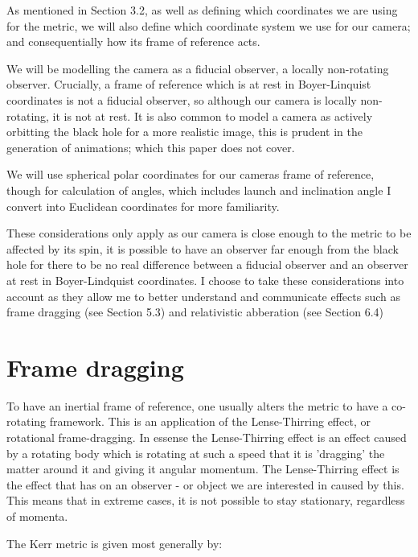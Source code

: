 \documentclass[oneside,openright,frontopenright, singlespacing]{dmathesis}
\begin{document}
\vspace{1em}
	As mentioned in Section 3.2, as well as defining which coordinates we are using for the metric, we will also define which coordinate system we use for our camera; and consequentially how its frame of reference acts. 

\vspace{1em}
	We will be modelling the camera as a fiducial observer, a locally non-rotating observer. Crucially, a frame of reference which is at rest in Boyer-Linquist coordinates is not a fiducial observer, so although our camera is locally non-rotating, it is not at rest. It is also common to model a camera as actively orbitting the black hole for a more realistic image, this is prudent in the generation of animations; which this paper does not cover.

\vspace{1em}
	We will use spherical polar coordinates for our cameras frame of reference, though for calculation of angles, which includes launch and inclination angle I convert into Euclidean coordinates for more familiarity.

\vspace{1em}
	These considerations only apply as our camera is close enough to the metric to be affected by its spin, it is possible to have an observer far enough from the black hole for there to be no real difference between a fiducial observer and an observer at rest in Boyer-Lindquist coordinates. I choose to take these considerations into account as they allow me to better understand and communicate effects such as frame dragging (see Section 5.3) and relativistic abberation (see Section 6.4)

\section{Frame dragging}

	To have an inertial frame of reference, one usually alters the metric to have a co-rotating framework. This is an application of the Lense-Thirring effect, or rotational frame-dragging. In essense the Lense-Thirring effect is an effect caused by a rotating body which is rotating at such a speed that it is 'dragging' the matter around it and giving it angular momentum. The Lense-Thirring effect is the effect that has on an observer - or object we are interested in caused by this. This means that in extreme cases, it is not possible to stay stationary, regardless of momenta.

\vspace{1em}
	The Kerr metric is given most generally by:
\end{document}
